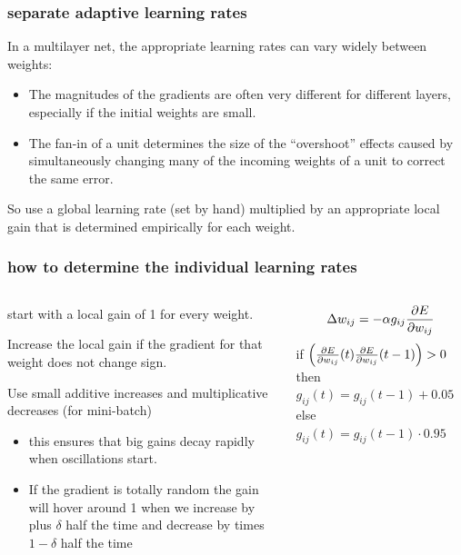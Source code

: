 \documentclass[USenglish,pdftex,compress,10pt,svgnamesi,handout]{beamer}
\begin{document}
\begin{frame}
\frametitle{separate adaptive learning rates}
In a multilayer net, the appropriate learning rates can vary widely between weights:
\begin{itemize}
\item  The magnitudes of the gradients are often very different for different layers, especially if the initial weights are small.
\item  The fan-in of a unit determines the size of the ``overshoot'' effects caused by simultaneously changing many of the incoming weights of a unit to correct the same error.
\end{itemize}

So use a global learning rate (set by hand) multiplied by an appropriate local gain that is determined empirically for each weight.
\end{frame}





\begin{frame}
\frametitle{how to determine the individual learning rates}
\begin{columns}
\begin{column}{6cm}
start with a local gain of 1 for every weight.

Increase the local gain if the gradient for
that weight does not change sign.

Use small additive increases and multiplicative decreases (for mini-batch)
\begin{itemize}
\item  this ensures that big gains decay rapidly when oscillations  start.
\item If the gradient is totally random the gain will hover around 1 when we increase by plus $\delta$ half the time and decrease by times $1-\delta$ half the time
\end{itemize}
\end{column}
\begin{column}{5cm}
$$\Delta w_{ij} = -\alpha g_{ij} {\partial E\over \partial w_{ij}}
$$
if $\Bigl(  {\partial E\over \partial w_{ij}}(t)  {\partial E\over \partial w_{ij}}(t-1) \Bigr) > 0$
\vskip5mm
then $g_{ij}(t) = g_{ij} (t-1) + 0.05$
\vskip5mm
else $g_{ij}(t) = g_{ij} (t-1) \cdot 0.95$
\end{column}
\end{columns}
\end{frame}
\end{document}
